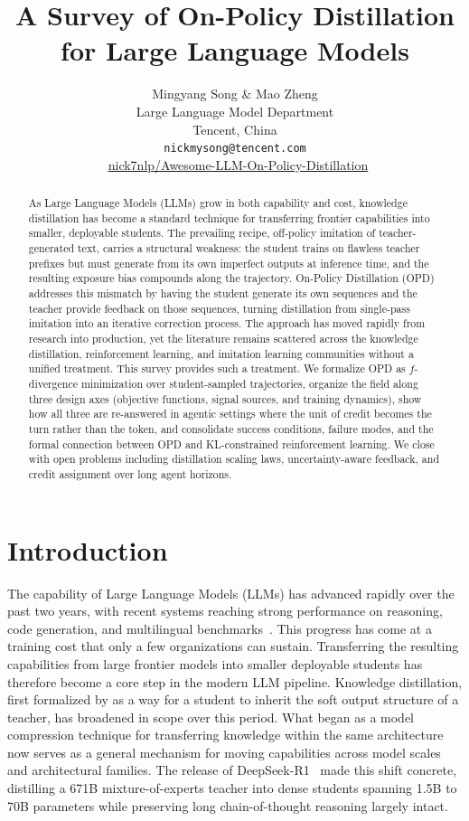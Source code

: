 \documentclass{article} %
\title{A Survey of On-Policy Distillation for Large Language Models}
\author{Mingyang Song \& Mao Zheng \\
Large Language Model Department \\Tencent, China\\
\texttt{nickmysong@tencent.com}\\[2pt]
\faGithub\ \href{https://github.com/nick7nlp/Awesome-LLM-On-Policy-Distillation}{nick7nlp/Awesome-LLM-On-Policy-Distillation}}
\begin{document}
\maketitle

\begin{abstract}
As Large Language Models (LLMs) grow in both capability and cost, knowledge distillation has become a standard technique for transferring frontier capabilities into smaller, deployable students. The prevailing recipe, off-policy imitation of teacher-generated text, carries a structural weakness: the student trains on flawless teacher prefixes but must generate from its own imperfect outputs at inference time, and the resulting exposure bias compounds along the trajectory. On-Policy Distillation (OPD) addresses this mismatch by having the student generate its own sequences and the teacher provide feedback on those sequences, turning distillation from single-pass imitation into an iterative correction process. The approach has moved rapidly from research into production, yet the literature remains scattered across the knowledge distillation, reinforcement learning, and imitation learning communities without a unified treatment. This survey provides such a treatment. We formalize OPD as $f$-divergence minimization over student-sampled trajectories, organize the field along three design axes (objective functions, signal sources, and training dynamics), show how all three are re-answered in agentic settings where the unit of credit becomes the turn rather than the token, and consolidate success conditions, failure modes, and the formal connection between OPD and KL-constrained reinforcement learning. We close with open problems including distillation scaling laws, uncertainty-aware feedback, and credit assignment over long agent horizons.
\end{abstract}

\section{Introduction}
\label{sec:intro}

The capability of Large Language Models (LLMs) has advanced rapidly over the past two years, with recent systems reaching strong performance on reasoning, code generation, and multilingual benchmarks~\citep{2505.09388,2501.12948,2408.00118}. This progress has come at a training cost that only a few organizations can sustain. Transferring the resulting capabilities from large frontier models into smaller deployable students has therefore become a core step in the modern LLM pipeline. Knowledge distillation, first formalized by \citet{1503.02531} as a way for a student to inherit the soft output structure of a teacher, has broadened in scope over this period. What began as a model compression technique for transferring knowledge within the same architecture now serves as a general mechanism for moving capabilities across model scales and architectural families. The release of DeepSeek-R1~\citep{2501.12948} made this shift concrete, distilling a 671B mixture-of-experts teacher into dense students spanning 1.5B to 70B parameters while preserving long chain-of-thought reasoning largely intact.
\end{document}
